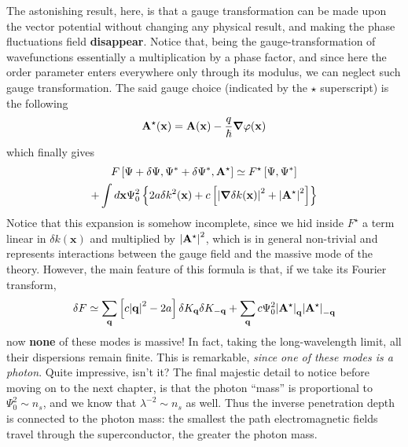 The astonishing result, here, is that a gauge transformation can be made upon the vector potential without changing any physical result, and making the phase fluctuations field \textbf{disappear}. Notice that, being the gauge-transformation of wavefunctions essentially a multiplication by a phase factor, and since here the order parameter enters everywhere only through its modulus, we can neglect such gauge transformation. The said gauge choice (indicated by the $\star$ superscript) is the following
\[
    \mathbf{A}^\star (\mathbf{x}) = \mathbf{A} (\mathbf{x}) - \frac{q}{\hbar} \grad \varphi (\mathbf{x})
\]
which finally gives
\begin{multline*}
    F \left[{ \Psi + \delta\Psi,\Psi^* + \delta\Psi^*,\mathbf{A}^\star }\right] \simeq F^\star \left[{ \Psi,\Psi^*}\right] \\
    + \int d\mathbf{x} \Psi_0^2 \left\lbrace
        2a \delta k^2 (\mathbf{x)} + c \left[{
            \abs{\grad \delta k(\mathbf{x})}^2 + \abs{\mathbf{A}^\star}^2
        }\right]
    \right\rbrace
\end{multline*}
Notice that this expansion is somehow incomplete, since we hid inside $F^\star$ a term linear in $\delta k(\mathbf{x})$ and multiplied by $\abs{\mathbf{A}^\star}^2$, which is in general non-trivial and represents interactions between the gauge field and the massive mode of the theory. However, the main feature of this formula is that, if we take its Fourier transform,
\[
    \delta F \simeq \sum_\mathbf{q} \left[{ c \abs{\mathbf{q}}^2 - 2a }\right] \delta K_\mathbf{q} \delta K_{-\mathbf{q}} +  \sum_\mathbf{q} c\Psi_0^2 \abs{\mathbf{A}^\star}_\mathbf{q} \abs{\mathbf{A}^\star}_{-\mathbf{q}}
\]
now \textbf{none} of these modes is massive! In fact, taking the long-wavelength limit, all their dispersions remain finite. This is remarkable, \textit{since one of these modes is a photon}. Quite impressive, isn't it? The final majestic detail to notice before moving on to the next chapter, is that the photon ``mass'' is proportional to $\Psi_0^2 \sim n_s$, and we know that $\lambda^{-2} \sim n_s$ as well. Thus the inverse penetration depth is connected to the photon mass: the smallest the path electromagnetic fields travel through the superconductor, the greater the photon mass.
